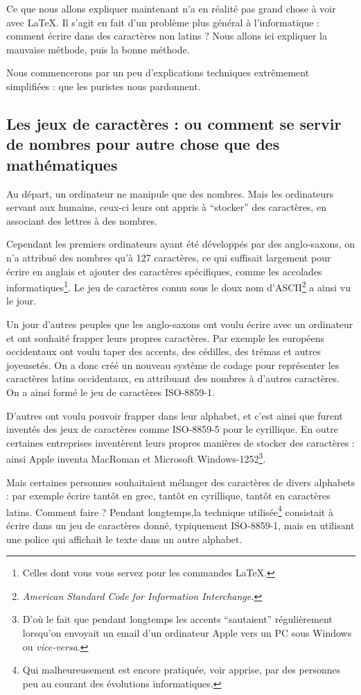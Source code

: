 Ce que nous allons expliquer maintenant n'a en réalité pas grand chose à voir avec \LaTeX. Il s'agit en fait d'un problème plus général à l'informatique : comment écrire dans des caractères non latins ? Nous allons ici expliquer la mauvaise méthode, puis la bonne méthode.

Nous commencerons par un peu d'explications techniques extrêmement simplifiées : que les puristes nous pardonnent.

\subsection{Les jeux de caractères : ou comment se servir de nombres pour autre chose que des mathématiques}

Au départ, un ordinateur ne manipule que des nombres. Mais les ordinateurs servant aux humains, ceux-ci leurs ont appris à \enquote{stocker} des caractères, en associant des lettres à des nombres.

Cependant les premiers ordinateurs ayant été développés par des anglo-saxons, on n'a  attribué des nombres qu'à  127 caractères, ce qui suffisait largement pour écrire en anglais et ajouter des caractères spécifiques, comme les accolades informatiques\footnote{Celles dont vous vous servez pour les commandes \LaTeX.}.  Le jeu de caractères connu sous le doux nom d'ASCII\footnote{\emph{\textenglish{American Standard Code for Information Interchange.}}} a ainsi vu le jour.

Un jour d'autres peuples que les anglo-saxons ont voulu écrire avec un ordinateur et ont souhaité frapper leurs propres caractères. Par exemple les européens occidentaux ont voulu taper des accents, des cédilles, des trémas et autres joyeusetés. On a donc créé un nouveau système de codage pour représenter les caractères latins occidentaux, en attribuant des nombres à d'autres caractères. On a ainsi formé le jeu de caractères  ISO-8859-1. 

D'autres  ont voulu pouvoir frapper dans leur alphabet, et c'est ainsi que furent inventés des jeux de caractères comme ISO-8859-5 pour le cyrillique. En outre certaines entreprises inventèrent leurs propres manières de stocker des caractères :  ainsi Apple inventa MacRoman et Microsoft Windows-1252\footnote{D'où le fait que pendant longtemps les accents \enquote{sautaient} régulièrement lorsqu'on envoyait un email d'un ordinateur Apple vers un PC sous Windows ou \emph{vice-versa}.}. 

Mais certaines personnes souhaitaient mélanger des caractères de divers alphabets : par exemple écrire tantôt en grec, tantôt en cyrillique, tantôt en caractères latins. Comment faire ? Pendant longtemps,la technique utilisée\footnote{Qui malheureusement est encore pratiquée, voir apprise, par des personnes peu au courant des évolutions informatiques.} consistait à écrire dans un jeu de caractères donné, typiquement ISO-8859-1, mais en utilisant une police qui affichait le texte dans un autre alphabet. 

